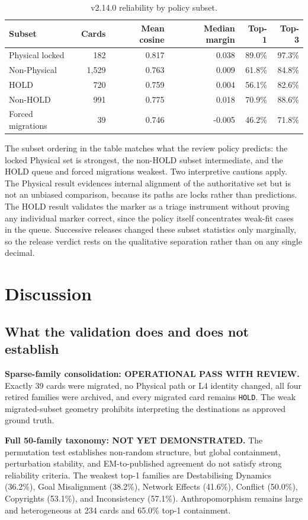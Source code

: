 \documentclass[11pt,a4paper]{article}
\newcommand{\code}[1]{\texttt{#1}}
\begin{document}
\begin{table}[H]
\centering
\caption{v2.14.0 reliability by policy subset.}
\small
\begin{tabular}{lrrrrr}
\toprule
Subset & Cards & Mean cosine & Median margin & Top-1 & Top-3 \\
\midrule
Physical locked & 182 & 0.817 & 0.038 & 89.0\% & 97.3\% \\
Non-Physical & 1,529 & 0.763 & 0.009 & 61.8\% & 84.8\% \\
HOLD & 720 & 0.759 & 0.004 & 56.1\% & 82.6\% \\
Non-HOLD & 991 & 0.775 & 0.018 & 70.9\% & 88.6\% \\
Forced migrations & 39 & 0.746 & -0.005 & 46.2\% & 71.8\% \\
\bottomrule
\end{tabular}
\end{table}

The subset ordering in the table matches what the review policy predicts: the
locked Physical set is strongest, the non-HOLD subset intermediate, and the
HOLD queue and forced migrations weakest. Two interpretive cautions apply. The
Physical result evidences internal alignment of the authoritative set but is
not an unbiased comparison, because its paths are locks rather than
predictions. The HOLD result validates the marker as a triage instrument
without proving any individual marker correct, since the policy itself
concentrates weak-fit cases in the queue. Successive releases changed these
subset statistics only marginally, so the release verdict rests on the
qualitative separation rather than on any single decimal.

\section{Discussion}
\label{sec:discussion}

\subsection{What the validation does and does not establish}

\textbf{Sparse-family consolidation: OPERATIONAL PASS WITH REVIEW.} Exactly 39
cards were migrated, no Physical path or L4 identity changed, all four retired
families were archived, and every migrated card remains \code{HOLD}. The weak
migrated-subset geometry prohibits interpreting the destinations as approved
ground truth.

\textbf{Full 50-family taxonomy: NOT YET DEMONSTRATED.} The permutation test
establishes non-random structure, but global containment, perturbation
stability, and EM-to-published agreement do not satisfy strong reliability
criteria. The weakest top-1 families are Destabilising Dynamics (36.2\%), Goal
Misalignment (38.2\%), Network Effects (41.6\%), Conflict (50.0\%), Copyrights
(53.1\%), and Inconsistency (57.1\%). Anthropomorphism remains large and
heterogeneous at 234 cards and 65.0\% top-1 containment.
\end{document}
